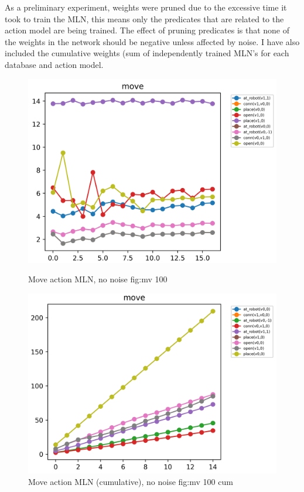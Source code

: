 As a preliminary experiment, weights were pruned due to the excessive time it took to train the MLN, this means only the predicates that are related to the action model are being trained.
The effect of pruning predicates is that none of the weights in the network should be negative unless affected by noise.
I have also included the cumulative weights (sum of independently trained MLN's for each database and action model.


\begin{figure}[h]
 \centering
 \begin{minipage}[b]{0.49\linewidth}
 \includegraphics[width=1\textwidth]{images/tests/movegraph_100}
 \caption{Move action MLN, no noise {fig:mv 100}}

 \end{minipage}
 \hfill
 \begin{minipage}[b]{0.49\linewidth}

 \includegraphics[width=1\textwidth]{images/tests/movegraph_100_cum}
 \caption{Move action MLN (cumulative), no noise {fig:mv 100 cum}}

 \end{minipage}
\end{figure}

